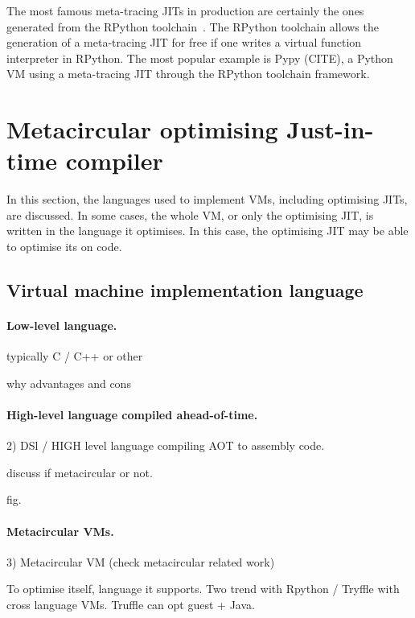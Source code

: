 \documentclass[a4paper,12pt,twoside]{../includes/ThesisStyle}
\begin{document}
The most famous meta-tracing JITs in production are certainly the ones generated from the RPython toolchain~\cite{Rigo06a}. The RPython toolchain allows the generation of a meta-tracing JIT for free if one writes a virtual function interpreter in RPython. The most popular example is Pypy (CITE), a Python VM using a meta-tracing JIT through the RPython toolchain framework.


\section{Metacircular optimising Just-in-time compiler}
\label{sec:implLang}

In this section, the languages used to implement VMs, including optimising JITs, are discussed. In some cases, the whole VM, or only the optimising JIT, is written in the language it optimises. In this case, the optimising JIT may be able to optimise its on code.

\subsection{Virtual machine implementation language}

\paragraph{Low-level language.}

typically C / C++ or other

why advantages and cons

\paragraph{High-level language compiled ahead-of-time.}

2) DSl / HIGH level language compiling AOT to assembly code.

discuss if metacircular or not.

fig.

\paragraph{Metacircular VMs.}
3) Metacircular VM (check metacircular related work)

To optimise itself, language it supports. Two trend with Rpython / Tryffle with cross language VMs. Truffle can opt guest + Java.
\end{document}
